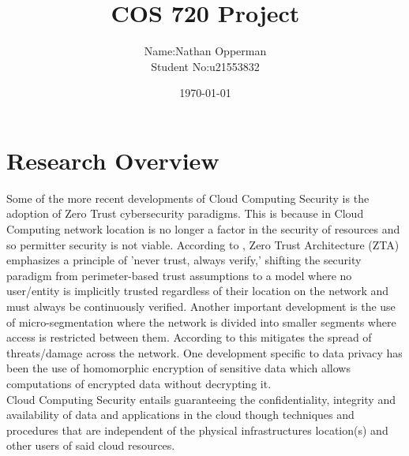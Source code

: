 \documentclass{article}
\author{\stfont \begin{tabular}{r@{ }l}
Name: &Nathan Opperman\\[1ex]
Student No:& u21553832
\end{tabular}}
\date{\today}
\title{\tfont COS 720 Project}
\newcommand{\spa}{\\[1ex]}
\begin{document}
\maketitle
\noindent
\section{\subsfont Research Overview}
Some of the more recent developments of Cloud Computing Security is the adoption of Zero Trust cybersecurity paradigms. This is because in Cloud Computing network location is no longer a factor in the security of resources and so permitter security is not viable. According to \cite{NIST_SP_800_207}, Zero Trust Architecture (ZTA) emphasizes a principle of 'never trust, always verify,' shifting the security paradigm from perimeter-based trust assumptions to a model where no user/entity is implicitly trusted regardless of their location on the network and must always be continuously verified. Another important development is the use of micro-segmentation where the network is divided into smaller segments where access is restricted between them. According to \cite{Joo_et_al_2023} this mitigates the spread of threats/damage across the network. One development specific to data privacy has been the use of homomorphic encryption of sensitive data which allows computations of encrypted data without decrypting it.\spa Cloud Computing Security entails guaranteeing the confidentiality, integrity and availability of data and applications in the cloud though techniques and procedures that are independent of the physical infrastructures location(s) and other users of said cloud resources.
{}

\end{document}
